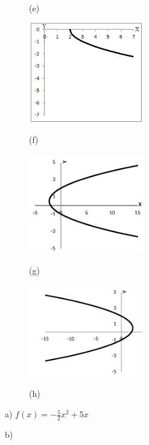 \begin{enumerate}[label=\thechapter.\arabic*]
\begin{multicols}{2}
\begin{figure}[H]
        (e)
\end{figure}

\begin{figure}[H]
        \includegraphics[width=1.99in,height=1.73in]{capitulos/funcao_do_segundo_grau/media/image47.png}
        
        (f)
\end{figure}

\begin{figure}[H]
        \includegraphics[width=1.99in,height=1.71in]{capitulos/funcao_do_segundo_grau/media/image48.pdf}
        
        (g)
\end{figure}

\begin{figure}[H]
        \includegraphics[width=1.96in,height=1.59in]{capitulos/funcao_do_segundo_grau/media/image49.pdf}
        
        (h)
\end{figure}
\end{multicols}

\ansitem{} a)  \( f \left( x \right) =-\frac{5}{2}x^{2}+5x \) 

\begin{table}[H]
    b)


\end{table}
\end{enumerate}
